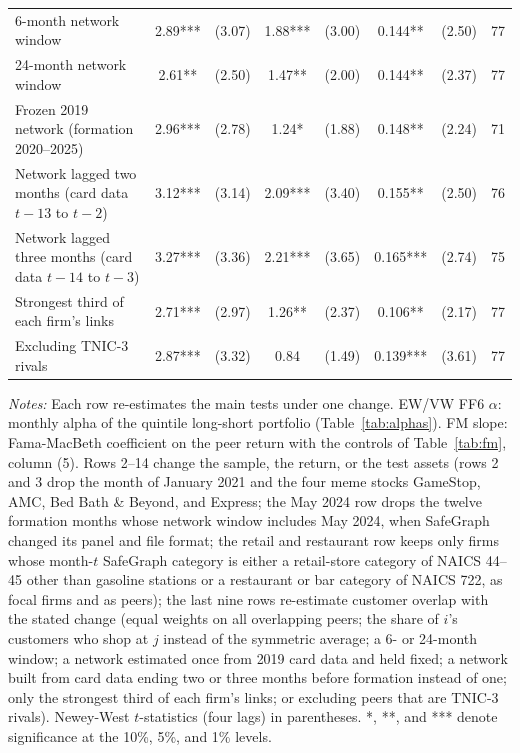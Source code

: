 \begin{table}[!htbp]
\begin{tabular*}{\linewidth}{@{\extracolsep{\fill}}lccccccc}
6-month network window & 2.89*** & (3.07) & 1.88*** & (3.00) & 0.144** & (2.50) & 77 \\
24-month network window & 2.61** & (2.50) & 1.47** & (2.00) & 0.144** & (2.37) & 77 \\
Frozen 2019 network (formation 2020--2025) & 2.96*** & (2.78) & 1.24* & (1.88) & 0.148** & (2.24) & 71 \\
Network lagged two months (card data $t-13$ to $t-2$) & 3.12*** & (3.14) & 2.09*** & (3.40) & 0.155** & (2.50) & 76 \\
Network lagged three months (card data $t-14$ to $t-3$) & 3.27*** & (3.36) & 2.21*** & (3.65) & 0.165*** & (2.74) & 75 \\
Strongest third of each firm's links & 2.71*** & (2.97) & 1.26** & (2.37) & 0.106** & (2.17) & 77 \\
Excluding TNIC-3 rivals & 2.87*** & (3.32) & 0.84 & (1.49) & 0.139*** & (3.61) & 77 \\
\bottomrule
\end{tabular*}
\par\vspace{4pt}\begin{minipage}{\linewidth}\scriptsize \emph{Notes:} Each row re-estimates the main tests under one change. EW/VW FF6 $\alpha$: monthly alpha of the quintile long-short portfolio (Table~\ref{tab:alphas}). FM slope: Fama-MacBeth coefficient on the peer return with the controls of Table~\ref{tab:fm}, column (5). Rows 2--14 change the sample, the return, or the test assets (rows 2 and 3 drop the month of January 2021 and the four meme stocks GameStop, AMC, Bed Bath \& Beyond, and Express; the May 2024 row drops the twelve formation months whose network window includes May 2024, when SafeGraph changed its panel and file format; the retail and restaurant row keeps only firms whose month-$t$ SafeGraph category is either a retail-store category of NAICS 44--45 other than gasoline stations or a restaurant or bar category of NAICS 722, as focal firms and as peers); the last nine rows re-estimate customer overlap with the stated change (equal weights on all overlapping peers; the share of $i$'s customers who shop at $j$ instead of the symmetric average; a 6- or 24-month window; a network estimated once from 2019 card data and held fixed; a network built from card data ending two or three months before formation instead of one; only the strongest third of each firm's links; or excluding peers that are TNIC-3 rivals). Newey-West $t$-statistics (four lags) in parentheses. *, **, and *** denote significance at the 10\%, 5\%, and 1\% levels.\end{minipage}
\end{table}